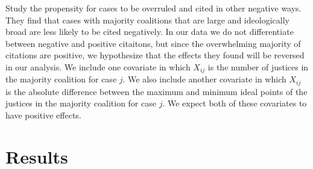 \documentclass[headsepline=true, abstracton]{scrartcl}
\begin{document}
\citet{benjamin2012standing} Study the propensity for cases to be overruled and cited in other negative ways. They find that cases with majority coalitions that are large and ideologically broad are less likely to be cited negatively. In our data we do not differentiate between negative and positive citaitons, but since the overwhelming majority of citations are positive, we hypothesize that the effects they found will be reversed in our analysis. We include one covariate in which $X_{ij}$ is the number of justices in the majority coalition for case $j$. We also include another covariate in which $X_{ij}$ is the absolute difference between the maximum and minimum ideal points of the justices in the majority coalition for case $j$. We expect both of these covariates to have positive effects.






 \section{Results}
\end{document}
